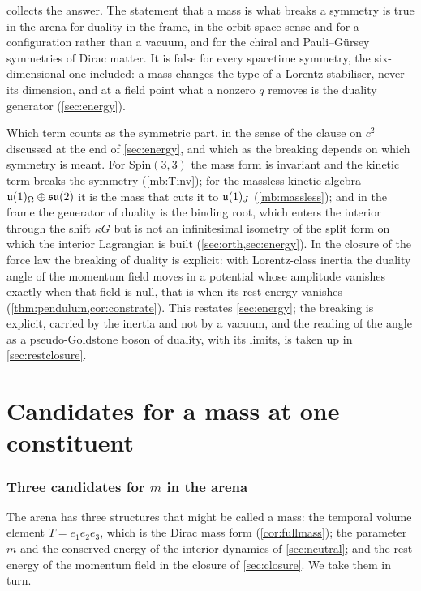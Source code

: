  collects the answer. The statement that a mass is what breaks a symmetry is true in the arena for duality in the
frame, in the orbit-space sense and for a configuration rather than a vacuum, and for the chiral and Pauli--G\"ursey symmetries of Dirac
matter. It is false for every spacetime symmetry, the six-dimensional one included: a mass changes the type of a Lorentz stabiliser, never its
dimension, and at a field point what a nonzero $q$ removes is the duality generator (\cref{sec:energy}).

Which term counts as the symmetric part, in the sense of the clause on $c^2$ discussed at the end of \cref{sec:energy}, and which as the breaking depends on which symmetry is meant. For $\mathrm{Spin}(3,3)$ the mass form is invariant and the
kinetic term breaks the symmetry (\cref{mb:Tinv}); for the massless kinetic algebra $\mathfrak{u}(1)_\Omega\oplus\mathfrak{su}(2)$ it is the mass that cuts it to
$\mathfrak{u}(1)_J$ (\cref{mb:massless}); and in the frame the generator of duality is the binding root, which enters the interior through the shift
$\kappa G$ but is not an infinitesimal isometry of the split form on which the interior Lagrangian is built (\cref{sec:orth,sec:energy}).
In the closure of the force law the breaking of duality is explicit: with Lorentz-class inertia the duality angle of the momentum field
moves in a potential whose amplitude vanishes exactly when that field is null, that is when its rest energy vanishes
(\cref{thm:pendulum,cor:constrate}). This restates \cref{sec:energy}; the breaking is explicit, carried by the inertia and not by a vacuum, and the reading of the angle as a
pseudo-Goldstone boson of duality, with its limits, is taken up in \cref{sec:restclosure}.

\section{Candidates for a mass at one constituent}
\label{sec:w:candidatesforamassatonec}

\subsubsection{\texorpdfstring{Three candidates for $m$ in the arena}{Three candidates for m in the arena}}
\label{sec:energy-candidates}

The arena has three structures that might be called a mass: the temporal volume element $T=e_1e_2e_3$, which is the Dirac mass form
(\cref{cor:fullmass}); the parameter $m$ and the conserved energy of the interior dynamics of \cref{sec:neutral}; and the rest energy of the
momentum field in the closure of \cref{sec:closure}. We take them in turn.

